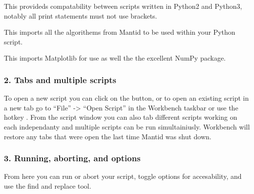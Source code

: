 \documentclass[letterpaper,10pt,english,openany]{sphinxmanual}
\begin{document}
This provideds compatability between scripts written in Python2 and Python3, notably
all print statements must not use brackets.

\begin{sphinxVerbatim}[commandchars=\\\{\}]
   
\end{sphinxVerbatim}

This imports all the algorithems from Mantid to be used within your Python script.

\begin{sphinxVerbatim}[commandchars=\\\{\}]
   
   
\end{sphinxVerbatim}

This imports Matplotlib for use as well the the excellent NumPy package.


\subsubsection{2. Tabs and multiple scripts}
\label{\detokenize{mantid_basic_course/using_workbench/03_Working_with_Python_in_Workbench:tabs-and-multiple-scripts}}
To open a new script you can click on the \sphinxstylestrong{+} button, or to open an existing script in a new tab go to “File” -\textgreater{} “Open Script” in the Workbench taskbar or use the hotkey .
From the script window you can also tab different scripts working on each independanty and multiple scripts can be run simultainiusly. Workbench will restore any tabs that were open
the last time Mantid was shut down.


\subsubsection{3. Running, aborting, and options}
\label{\detokenize{mantid_basic_course/using_workbench/03_Working_with_Python_in_Workbench:running-aborting-and-options}}
From here you can run or abort your script, toggle options for accesability, and use the find and replace tool.
\end{document}
